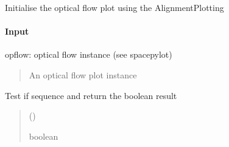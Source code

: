 \documentclass[letterpaper,10pt,english]{sphinxmanual}
\begin{document}

\begin{fulllineitems}
\label{\detokenize{api/pymusepipe:pymusepipe.align_pipe.init_plot_optical_flow}}
\pysigstartsignatures
{}
\pysigstopsignatures
\sphinxAtStartPar
Initialise the optical flow plot using the AlignmentPlotting


\paragraph{Input}
\label{\detokenize{api/pymusepipe:id35}}
\sphinxAtStartPar
opflow: optical flow instance (see spacepylot)
\begin{quote}\begin{description}
\sphinxAtStartPar
An optical flow plot instance

\end{description}\end{quote}

\end{fulllineitems}


\begin{fulllineitems}
\label{\detokenize{api/pymusepipe:pymusepipe.align_pipe.is_sequence}}
\pysigstartsignatures
{}
\pysigstopsignatures
\sphinxAtStartPar
Test if sequence and return the boolean result
\begin{quote}\begin{description}
\sphinxAtStartPar
{} () \textendash{} 

\sphinxAtStartPar
{}

\sphinxAtStartPar
boolean

\end{description}\end{quote}

\end{fulllineitems}
\end{document}

